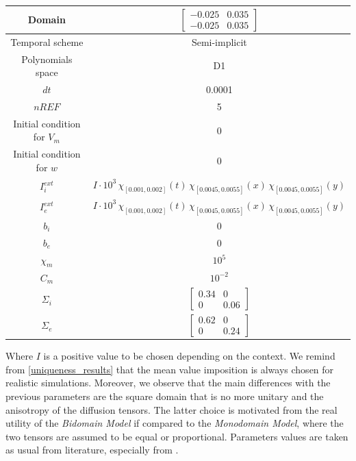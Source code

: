 \documentclass[a4paper,11pt]{article}
\begin{document}
\begin{center}
	\begin{tabular}{|c|c|} 
		\hline 
		\rule[-4mm]{0mm}{1cm}
		Domain & $\begin{bmatrix} -0.025 & 0.035 \\ -0.025 & 0.035\end{bmatrix}$ \\
		\hline
		\rule[-4mm]{0mm}{1cm}
		Temporal scheme & Semi-implicit \\
		\hline
		\rule[-4mm]{0mm}{1cm}
		Polynomials space & D1 \\
		\hline
		\rule[-4mm]{0mm}{1cm}
		$dt$ & 0.0001 \\
		\hline
		\rule[-4mm]{0mm}{1cm}
		$nREF$ & 5 \\ 
		\hline
		\rule[-4mm]{0mm}{1cm}
		Initial condition for $V_m$ & 0 \\
		\hline
		\rule[-4mm]{0mm}{1cm}
		Initial condition for $w$ & 0 \\
		\hline
		\rule[-4mm]{0mm}{1cm}
		$I_i^{ext}$ & $I \cdot 10^3 \, \chi_{[0.001,0.002]}(t) \, \chi_{[0.0045,0.0055]}(x) \, \chi_{[0.0045,0.0055]}(y)$ \\
		\hline
		\rule[-4mm]{0mm}{1cm}
		$I_e^{ext}$ & $I \cdot 10^3 \, \chi_{[0.001,0.002]}(t) \, \chi_{[0.0045,0.0055]}(x) \, \chi_{[0.0045,0.0055]}(y)$ \\
		\hline
		\rule[-4mm]{0mm}{1cm}
		$b_i$ & 0 \\
		\hline
		\rule[-4mm]{0mm}{1cm}
		$b_e$ & 0 \\
		\hline 
		\rule[-4mm]{0mm}{1cm}
		$\chi_m$ & $10^5$ \\
		\hline 
		\rule[-4mm]{0mm}{1cm}
		$C_m$ & $10^{-2}$ \\
		\hline
		\rule[-4mm]{0mm}{1cm}
		$\Sigma_i$ & $\begin{bmatrix} 0.34 & 0 \\ 0 & 0.06\end{bmatrix}$ \\
		\hline
		\rule[-4mm]{0mm}{1cm}
		$\Sigma_e$ & $\begin{bmatrix} 0.62 & 0 \\ 0 & 0.24 \end{bmatrix}$ \\
		\hline 
	\end{tabular}
\end{center}
 \vspace{4mm}
\noindent Where $I$ is a positive value to be chosen depending on the context. We remind from \ref{uniqueness_results} that the mean value imposition is always chosen for realistic simulations. Moreover, we observe that the main differences with the previous parameters are the square domain that is no more unitary and the anisotropy of the diffusion tensors. The latter choice is motivated from the real utility of the \emph{Bidomain Model} if compared to the \emph{Monodomain Model}, where the two tensors are assumed to be equal or proportional. Parameters values are taken as usual from literature, especially from \cite{acta}. \\
\end{document}
